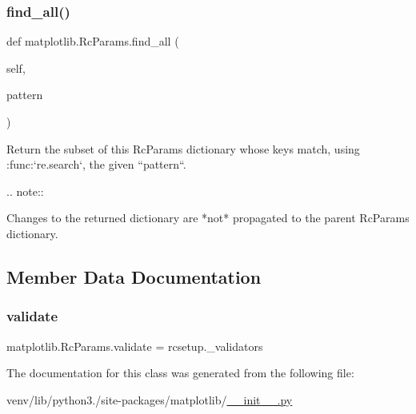 \subsubsection{\texorpdfstring{find\+\_\+all()}{find\_all()}}
{\footnotesize\ttfamily def matplotlib.\+Rc\+Params.\+find\+\_\+all (\begin{DoxyParamCaption}\item[{}]{self,  }\item[{}]{pattern }\end{DoxyParamCaption})}

\begin{DoxyVerb}Return the subset of this RcParams dictionary whose keys match,
using :func:`re.search`, the given ``pattern``.

.. note::

    Changes to the returned dictionary are *not* propagated to
    the parent RcParams dictionary.\end{DoxyVerb}
 

\subsection{Member Data Documentation}
\mbox{\label{classmatplotlib_1_1RcParams_aefc67140c0d848c2b03f2d3b8c9a02dd}} 
\subsubsection{\texorpdfstring{validate}{validate}}
{\footnotesize\ttfamily matplotlib.\+Rc\+Params.\+validate = rcsetup.\+\_\+validators\hspace{0.3cm}{\ttfamily [static]}}



The documentation for this class was generated from the following file\+:\begin{DoxyCompactItemize}
\item 
venv/lib/python3./site-\/packages/matplotlib/\hyperlink{venv_2lib_2python3_89_2site-packages_2matplotlib_2____init_____8py}{\+\_\+\+\_\+init\+\_\+\+\_\+.\+py}\end{DoxyCompactItemize}
